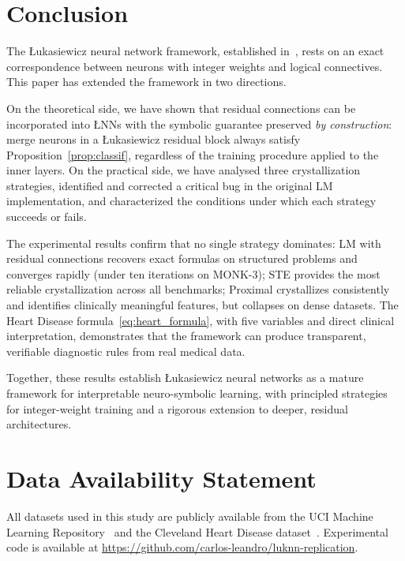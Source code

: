 \documentclass[10pt,a4paper,twoside]{article}
\newcommand{\LNN}{\L{}NN}
\begin{document}
\section{Conclusion}
\label{sec:conclusion}

The \L{}ukasiewicz neural network framework, established in~\cite{leandro2009},
rests on an exact correspondence between neurons with integer weights and
logical connectives.
This paper has extended the framework in two directions.

On the theoretical side, we have shown that residual connections can be
incorporated into \LNN{}s with the symbolic guarantee preserved
\emph{by construction}: merge neurons in a \L{}ukasiewicz residual block
always satisfy Proposition~\ref{prop:classif}, regardless of the training
procedure applied to the inner layers.
On the practical side, we have analysed three crystallization strategies,
identified and corrected a critical bug in the original LM implementation,
and characterized the conditions under which each strategy succeeds or fails.

The experimental results confirm that no single strategy dominates: LM with
residual connections recovers exact formulas on structured problems and
converges rapidly (under ten iterations on MONK-3); STE provides the most
reliable crystallization across all benchmarks; Proximal crystallizes
consistently and identifies clinically meaningful features, but collapses
on dense datasets.
The Heart Disease formula~\eqref{eq:heart_formula}, with five variables and
direct clinical interpretation, demonstrates that the framework can produce
transparent, verifiable diagnostic rules from real medical data.

Together, these results establish \L{}ukasiewicz neural networks as a mature
framework for interpretable neuro-symbolic learning, with principled
strategies for integer-weight training and a rigorous extension to deeper,
residual architectures.

\section*{Data Availability Statement}

All datasets used in this study are publicly available from the UCI Machine
Learning Repository~\cite{uci2017} and the Cleveland Heart Disease
dataset~\cite{detrano1989}.
Experimental code is available at
\url{https://github.com/carlos-leandro/luknn-replication}.
\end{document}
